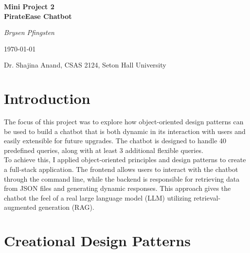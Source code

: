 \documentclass[11pt]{article}
\newcommand{\coverpage}{
    \begin{titlepage}
        \centering
        \vspace*{3cm}
        {\Huge\bfseries Mini Project 2 \\ PirateEase Chatbot\par}
        \vspace{2cm}
        {\Large\itshape Brysen Pfingsten\par}
        \vfill
        {\large \today\par}
        \vspace{1cm}
        {\large Dr. Shajina Anand, CSAS 2124, Seton Hall University\par}
        \vspace*{2cm}
    \end{titlepage}
}
\begin{document}
\coverpage

\tableofcontents
\newpage

\section{Introduction}
The focus of this project was to explore how object-oriented design patterns can be used to build a chatbot that is both dynamic in its interaction with users and easily extensible for future upgrades. The chatbot is designed to handle 40 predefined queries, along with at least 3 additional flexible queries. \\
\noindent
To achieve this, I applied object-oriented principles and design patterns to create a full-stack application. The frontend allows users to interact with the chatbot through the command line, while the backend is responsible for retrieving data from JSON files and generating dynamic responses. This approach gives the chatbot the feel of a real large language model (LLM) utilizing retrieval-augmented generation (RAG).

\section{Creational Design Patterns} 
\end{document}
